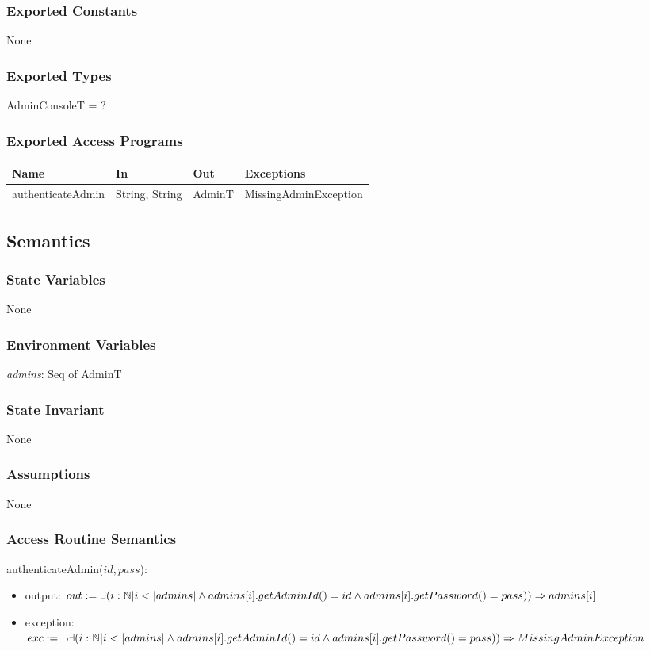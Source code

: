 \documentclass[12pt, titlepage]{article}
\begin{document}
\subsubsection{Exported Constants}
None

\subsubsection{Exported Types}
AdminConsoleT = ?

\subsubsection{Exported Access Programs}

\begin{tabular}{l l l l}
\hline
\textbf{Name} & \textbf{In} & \textbf{Out} & \textbf{Exceptions} \\
\hline
authenticateAdmin & String, String & AdminT & MissingAdminException \\
\hline
\end{tabular}

\subsection{Semantics}

\subsubsection{State Variables}
None

\subsubsection{Environment Variables}
\textit{admins}: Seq of AdminT 

\subsubsection{State Invariant}
None

\subsubsection{Assumptions}
None

\subsubsection{Access Routine Semantics}

\noindent authenticateAdmin($id, pass$):
\begin{itemize}
\item output: $out := \exists (i : \mathbb{N} | i < |admins| \land
admins[i].getAdminId() = id \land \\ admins[i].getPassword() = pass))
\Rightarrow admins[i]$
\item exception: $exc := \neg \exists (i : \mathbb{N} | i < |admins| \land
admins[i].getAdminId() = id \land \\ admins[i].getPassword() = pass))
\Rightarrow MissingAdminException$
\end{itemize}
\end{document}
